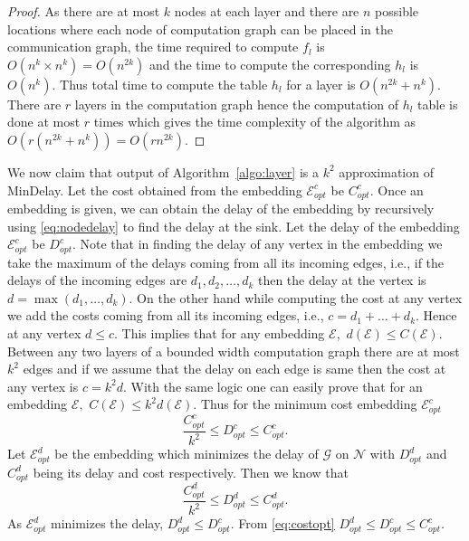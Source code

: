 \documentclass[journal]{IEEEtran}
\newcommand{\net}{\mathcal{N}}
\newcommand{\compgraph}{\mathcal{G}}
\newcommand{\mindelay}{\textsf{MinDelay}}
\newcommand{\embedding}{\mathcal{E}}
\begin{document}
\begin{proof}
  As there are at most $k$ nodes at each layer and there are $n$
  possible locations where each node of computation graph can be
  placed in the communication graph, the time required to compute
  $f_l$ is $O(n^k \times n^k) = O(n^{2k})$ and the time to compute the
  corresponding $h_l$ is $O(n^k).$ Thus total time to compute the
  table $h_l$ for a layer is $O(n^{2k}+n^{k}).$ There are $r$ layers
  in the computation graph hence the computation of $h_l$ table is
  done at most $r$ times which gives the time complexity of the
  algorithm as $O(r (n^{2k}+n^{k}))=O(rn^{2k}).$
\end{proof}


We now claim that output of Algorithm~\ref{algo:layer} is a $k^2$
approximation of \mindelay. Let the cost obtained from the embedding
$\embedding_{opt}^c$ be $C_{opt}^{c}.$ Once an embedding is given, we
can obtain the delay of the embedding by recursively using
\eqref{eq:nodedelay} to find the delay at the sink. Let the delay of
the embedding $\embedding_{opt}^c$ be $D_{opt}^{c}.$ Note that in
finding the delay of any vertex in the embedding we take the maximum
of the delays coming from all its incoming edges, i.e., if the delays
of the incoming edges are $d_1,d_2,\ldots,d_k$ then the delay at the
vertex is $d = \max(d_1,\ldots,d_k).$ On the other hand while
computing the cost at any vertex we add the costs coming from all its
incoming edges, i.e., $c = d_1+\ldots+d_k.$ Hence at any vertex $d
\leq c.$ This implies that for any embedding $\embedding,$ $d(\embedding) \leq C(\embedding).$
Between any two layers of a bounded width computation graph there
are at most $k^2$ edges and if we assume that the delay on each edge
is same then the cost at any vertex is $c =k^2d.$ With the same logic
one can easily prove that for an embedding $\embedding,$ $C(\embedding) \leq k^2 d(\embedding).$
Thus for the minimum cost embedding $\embedding_{opt}^c$
\begin{equation}
  \frac{C_{opt}^{c}}{k^2} \leq D_{opt}^{c} \leq C_{opt}^{c}. \label{eq:costopt}
\end{equation}
Let $\embedding_{opt}^d$ be the embedding which minimizes the delay of
$\compgraph$ on $\net$ with $D_{opt}^{d}$ and $C_{opt}^{d}$ being its delay and cost respectively. Then we know that
\begin{equation}
  \frac{C_{opt}^{d}}{k^2} \leq D_{opt}^{d} \leq
  C_{opt}^{d}. \label{eq:delayopt}
\end{equation}
As $\embedding_{opt}^d$ minimizes the delay, $D_{opt}^{d} \leq D_{opt}^{c}.$ From \eqref{eq:costopt} $D_{opt}^{d} \leq D_{opt}^{c} \leq C_{opt}^{c}.$
\end{document}
